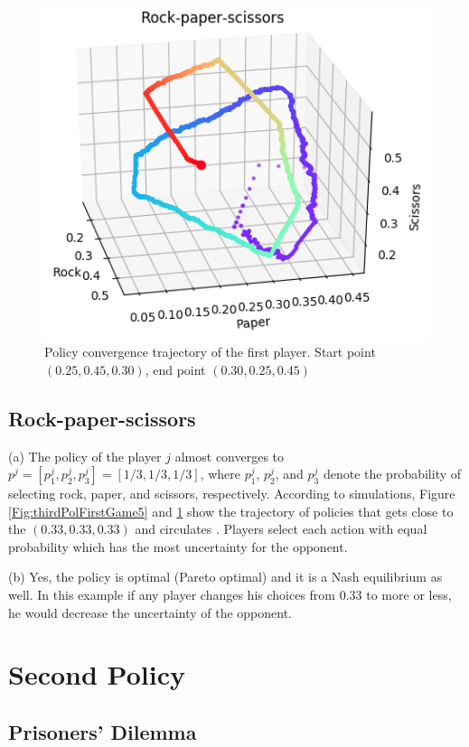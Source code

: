 \documentclass[journal]{IEEEtran}
\begin{document}
\begin{figure}[!t]

\centering
\includegraphics[scale=0.37]{figure/thirdGameFirstPolicy2m.png}
\caption{Policy convergence trajectory of the first player. Start point $(0.25, 0.45, 0.30)$, end point $(0.30, 0.25, 0.45)$}
\label{Fig:thirdPolFirstGame6}
\end{figure}
\subsection{Rock-paper-scissors}
(a) The policy of the player $j$ almost converges to $p^{j}= [p^{j}_{1}, p_{2}^{j}, p_{3}^{j}]=[1/3, 1/3, 1/3]$, where $p^{j}_{1}$, $p^{j}_{2}$, and $p^{j}_{3}$ denote the probability of selecting rock, paper, and scissors, respectively. According to simulations, Figure \ref{Fig:thirdPolFirstGame5} and \ref{Fig:thirdPolFirstGame6} show the trajectory of policies that gets close to the  $(0.33, 0.33, 0.33)$ and circulates \cite{the}. Players select each action with equal probability which has the most uncertainty for the opponent.

(b) Yes, the policy is optimal (Pareto optimal) and it is a Nash equilibrium as well. In this example if any player changes his choices from $0.33$ to more or less, he would decrease the uncertainty of the opponent.

\section{Second Policy} 
\subsection{Prisoners' Dilemma}
\end{document}
